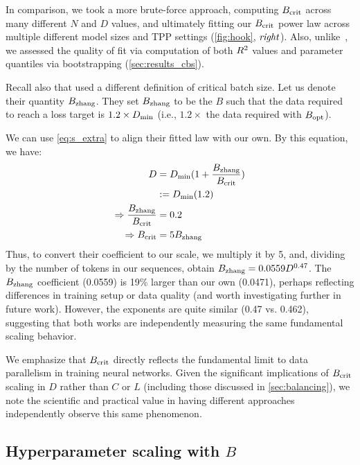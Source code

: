 In comparison, we took a more brute-force approach, computing $B_{\text{crit}}$
across many different $N$ and $D$ values, and ultimately fitting our
$B_{\text{crit}}$ power law across multiple different model sizes and TPP
settings (\cref{fig:hook}, $\text{\emph{right}}$).  Also,
unlike~\citet{zhang2024how}, we assessed the quality of fit via
computation of both $R^{2}$ values and parameter quantiles via
bootstrapping (\cref{sec:results_cbs}).

Recall also that \citet{zhang2024how} used a different definition of
critical batch size.  Let us denote their quantity $B_{\text{zhang}}$.  They
set $B_{\text{zhang}}$ to be the $B$ such that the data required to reach a
loss target is $1.2 \times D_{\text{min}}$ (i.e., $1.2 \times$ the data
required with $B_{\text{opt}}$).

We can use \cref{eq:s_extra} to align their fitted law with our own.
By this equation, we have:
\begin{align*}
  D &= D_{\text{min}}(1 + \frac{B_{\text{zhang}}}{B_{\text{crit}}}) \\
    &:= D_{\text{min}}(1.2) \\
  \Rightarrow \frac{B_{\text{zhang}}}{B_{\text{crit}}} &= 0.2 \\
  \Rightarrow B_{\text{crit}} &= 5 B_{\text{zhang}}
\end{align*}
%
Thus, to convert their coefficient to our scale, we multiply it by 5,
and, dividing by the number of tokens in our sequences, obtain
$B_{\text{zhang}} = 0.0559 D^{0.47}$.
%
The $B_{\text{zhang}}$ coefficient (0.0559) is 19\% larger than our own
(0.0471), perhaps reflecting differences in training setup or data
quality (and worth investigating further in future work).
%
However, the exponents are quite similar (0.47 vs. 0.462), suggesting
that both works are independently measuring the same fundamental
scaling behavior.

We emphasize that $B_{\text{crit}}$ directly reflects the fundamental limit to
data parallelism in training neural networks.  Given the significant
implications of $B_{\text{crit}}$ scaling in $D$ rather than $C$ or $L$
(including those discussed in \cref{sec:balancing}), we note the
scientific and practical value in having different approaches
independently observe this same phenomenon.

\subsection{Hyperparameter scaling with $B$}

